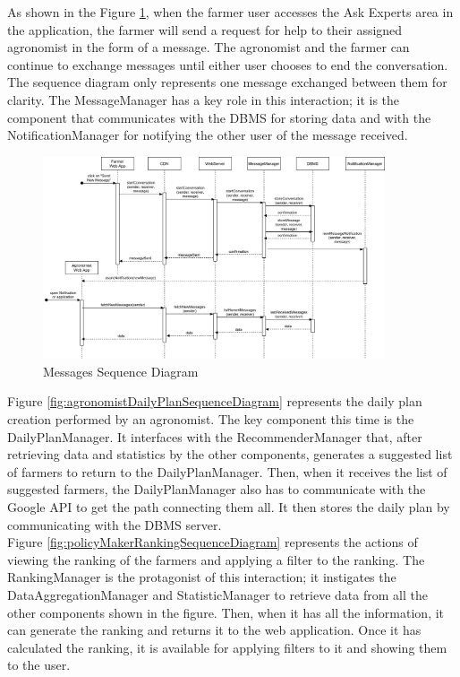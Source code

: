 \noindent
As shown in the Figure \ref{fig:messagesSequenceDiagram}, when the farmer user accesses the Ask Experts area in the application, the farmer will send a request for help to their assigned agronomist in the form of a message. The agronomist and the farmer can continue to exchange messages until either user chooses to end the conversation. The sequence diagram only represents one message exchanged between them for clarity. The MessageManager has a key role in this interaction; it is the component that communicates with the DBMS for storing data and with the NotificationManager for notifying the other user of the message received.\\


\begin{figure}[hbt!]
\centering
\includegraphics[width=0.9\textwidth]{../images_diagrams/dd/messagesSequenceDiagram.png}
\caption{Messages Sequence Diagram}
\label{fig:messagesSequenceDiagram}
\end{figure}

\noindent
Figure \ref{fig:agronomistDailyPlanSequenceDiagram} represents the daily plan creation performed by an agronomist. The key component this time is the DailyPlanManager. It interfaces with the RecommenderManager that, after retrieving data and statistics by the other components, generates a suggested list of farmers to return to the DailyPlanManager. Then, when it receives the list of suggested farmers, the DailyPlanManager also has to communicate with the Google API to get the path connecting them all. It then stores the daily plan by communicating with the DBMS server.\\

\noindent
Figure \ref{fig:policyMakerRankingSequenceDiagram} represents the actions of viewing the ranking of the farmers and applying a filter to the ranking. The RankingManager is the protagonist of this interaction; it instigates the DataAggregationManager and StatisticManager to retrieve data from all the other components shown in the figure. Then, when it has all the information, it can generate the ranking and returns it to the web application.
Once it has calculated the ranking, it is available for applying filters to it and showing them to the user.\\



